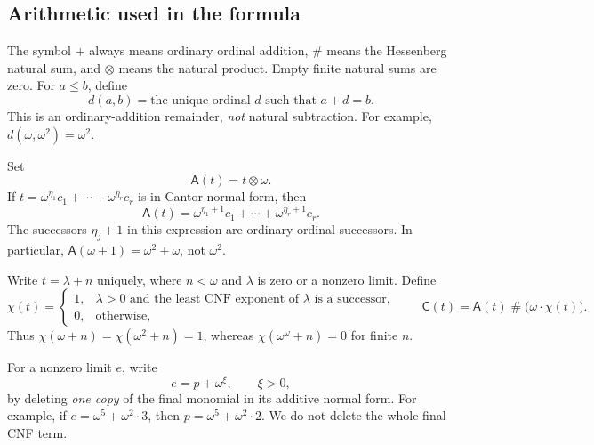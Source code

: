 \documentclass[11pt,a4paper]{article}
\theoremstyle{definition}
\newcommand{\ns}{\mathbin{\#}}
\newcommand{\nprod}{\mathbin{\otimes}}
\newcommand{\FunA}{\mathsf A}
\newcommand{\FunC}{\mathsf C}
\newcommand{\dd}[2]{d(#1,#2)}
\begin{document}
\subsection{Arithmetic used in the formula}\label{subsec:notation}
The symbol $+$ always means ordinary ordinal addition, $\ns$ means the
Hessenberg natural sum, and $\nprod$ means the natural product. Empty finite
natural sums are zero. For $a\le b$, define
\begin{equation}\label{eq:remainder}
 \dd{a}{b}=\text{the unique ordinal }d\text{ such that }a+d=b.
\end{equation}
This is an ordinary-addition remainder, \emph{not} natural subtraction.
For example, $\dd{\omega}{\omega^2}=\omega^2$.

Set
\begin{equation}\label{eq:A}
 \FunA(t)=t\nprod\omega.
\end{equation}
If $t=\omega^{\eta_1}c_1+\cdots+\omega^{\eta_r}c_r$ is in Cantor normal form,
then
\begin{equation}\label{eq:Acnf}
 \FunA(t)=\omega^{\eta_1+1}c_1+\cdots+\omega^{\eta_r+1}c_r.
\end{equation}
The successors $\eta_j+1$ in this expression are ordinary ordinal successors.
In particular, $\FunA(\omega+1)=\omega^2+\omega$, not $\omega^2$.

Write $t=\lambda+n$ uniquely, where $n<\omega$ and $\lambda$ is zero or a
nonzero limit. Define
\begin{equation}\label{eq:chi}
 \chi(t)=
 \begin{cases}
  1,&\lambda>0\text{ and the least CNF exponent of }\lambda
       \text{ is a successor},\\
  0,&\text{otherwise},
 \end{cases}
 \qquad
 \FunC(t)=\FunA(t)\ns\bigl(\omega\cdot\chi(t)\bigr).
\end{equation}
Thus $\chi(\omega+n)=\chi(\omega^2+n)=1$, whereas
$\chi(\omega^\omega+n)=0$ for finite $n$.

For a nonzero limit $e$, write
\begin{equation}\label{eq:lastmonomial}
 e=p+\omega^\xi,\qquad \xi>0,
\end{equation}
by deleting \emph{one copy} of the final monomial in its additive normal form.
For example, if $e=\omega^5+\omega^2\cdot3$, then
$p=\omega^5+\omega^2\cdot2$. We do not delete the whole final CNF term.
\end{document}
